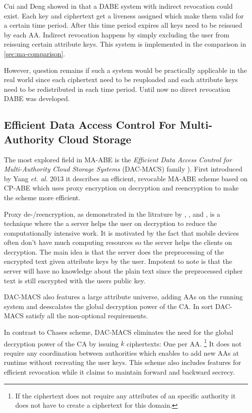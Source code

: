 Cui and Deng showed in \cite{cui2016revocable} that a DABE system with indirect revocation could exist. Each key and ciphertext get a liveness assigned which make them valid for a certain time period. After this time period expires all keys need to be reissued by each \ac{AA}. Indirect revocation happens by simply excluding the user from reissuing certain attribute keys. This system is implemented in the comparison in \ref{sec:ma-comparison}.

However, question remains if such a system would be practically applicable in the real world since each ciphertext need to be reuploaded and each attribute keys need to be redistributed in each time period. Until now no direct revocation DABE was developed.

\subsection{Efficient Data Access Control For Multi-Authority Cloud Storage}
\label{sec:dac-macs}
The most explored field in \ac{MA-ABE} is the \textit{Efficient Data Access Control for Multi-Authority Cloud Storage Systems} (\ac{DAC-MACS}) family \cite{yang2013dac}). First introduced by Yang \textit{et. al.} 2013 it describes an efficient, revocable \ac{MA-ABE} scheme based on \ac{CP-ABE} which uses proxy encryption on decryption and reencryption to make the scheme more efficient. 

Proxy de-/reencryption, as demonstrated in the litrature by \cite{yang2013dac}, \cite{wu2017security}, \cite{li2017two} and \cite{wang2011hierarchical}, is a technique where the a server helps the user on decryption to reduce the computationally intensive work. It is motivated by the fact that mobile devices often don't have much computing resources so the server helps the clients on decryption. The main idea is that the server does the preprocessing of the encrypted text given attribute keys by the user. Impotent to note is that the server will have no knowledge about the plain text since the preprocessed cipher text is still encrypted with the users public key.

DAC-MACS also features a large attribute universe, adding \ac{AA}s on the running system and deescalates the global decryption power of the \ac{CA}. In sort \ac{DAC-MACS} satisfy all the non-optional requirements.

In contrast to Chases scheme, DAC-MACS eliminates the need for the global decryption power of the \ac{CA} by issuing $k$ ciphertexts: One per \ac{AA}. \footnote{If the ciphertext does not require any attributes of an specific authority it does not have to create a ciphertext for this domain.} It does not require any coordination between authorities which enables to add new \ac{AA}s at runtime without recreating the user keys. This scheme also includes features for efficient revocation while it claims to maintain forward and backward secrecy.

